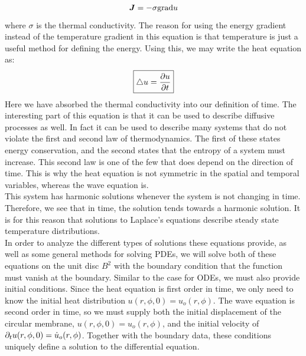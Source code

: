 \documentclass{article}
\begin{document}
\begin{equation}
  \bm{J}=-\sigma\mathrm{grad} u
\end{equation}
where $\sigma$ is the thermal conductivity. The reason for using the energy gradient instead of the temperature gradient in this equation is that temperature is just a useful method for defining the energy. Using this, we may write the heat equation as:
\begin{equation}
  \boxed{
    \bigtriangleup u = \frac{\partial u}{\partial t}
  }
\end{equation}
Here we have absorbed the thermal conductivity into our definition of time. The interesting part of this equation is that it can be used to describe diffusive processes as well. In fact it can be used to describe many systems that do not violate the first and second law of thermodynamics. The first of these states energy conservation, and the second states that the entropy of a system must increase. This second law is one of the few that does depend on the direction of time. This is why the heat equation is not symmetric in the spatial and temporal variables, whereas the wave equation is.\\
This system has harmonic solutions whenever the system is not changing in time. Therefore, we see that in time, the solution tends towards a harmonic solution. It is for this reason that solutions to Laplace's equations describe steady state temperature distributions.\\
In order to analyze the different types of solutions these equations provide, as well as some general methods for solving PDEs, we will solve both of these equations on the unit disc $B^2$ with the boundary condition that the function must vanish at the boundary. Similar to the case for ODEs, we must also provide initial conditions. Since the heat equation is first order in time, we only need to know the initial heat distribution $u(r,\phi,0)=u_o(r,\phi)$. The wave equation is second order in time, so we must supply both the initial displacement of the circular membrane, $u(r,\phi,0)=u_o(r,\phi)$, and the initial velocity of $\partial_{t} u(r,\phi,0)=\dot{u}_o(r,\phi)$. Together with the boundary data, these conditions uniquely define a solution to the differential equation.
\end{document}
